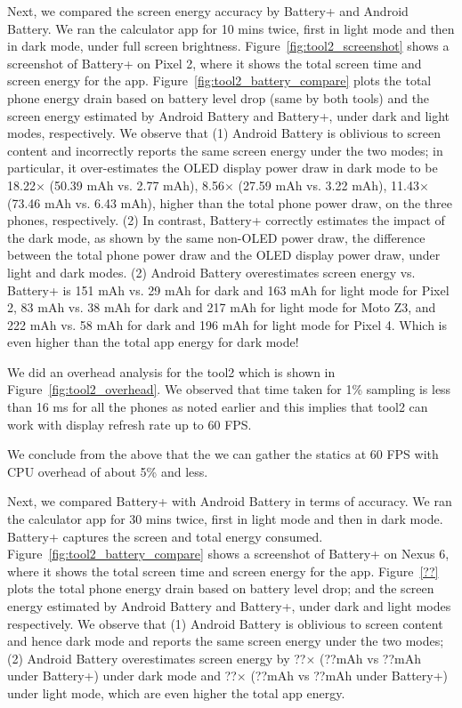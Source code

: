 Next, we compared the screen energy accuracy by 
Battery+ and Android Battery.
We ran the calculator app for 10 mins twice, first in light mode and then in
dark mode, under full screen brightness.
Figure~\ref{fig:tool2_screenshot} shows a screenshot of
Battery+ on Pixel 2, where it shows the total screen time and screen energy
for the app.
Figure~\ref{fig:tool2_battery_compare} plots the
total phone energy drain based on battery level drop (same by  both tools)
and the screen energy estimated by Android Battery and Battery+,
under dark and light modes, respectively.
We observe that
(1) Android Battery is oblivious to screen content and incorrectly reports
the same screen energy under the two modes;
in particular, it over-estimates the  OLED display power draw in dark mode
to be 18.22$\times$ (50.39 mAh vs. 2.77 mAh), 
8.56$\times$ (27.59 mAh vs. 3.22 mAh), 
11.43$\times$ (73.46 mAh vs. 6.43 mAh),
higher than the total phone power draw, on the three phones, respectively.
(2) In contrast, Battery+ correctly estimates the impact of the dark mode,
as shown by the same non-OLED power draw, \ie the difference 
between the total phone power draw and the OLED display power draw,
under light and dark modes.
(2) Android Battery overestimates screen energy vs. Battery+ is
151 mAh vs. 29 mAh for dark and 163 mAh for light mode for Pixel 2,
83 mAh vs. 38 mAh for dark and 217 mAh for light mode for Moto Z3, and
222 mAh vs. 58 mAh for dark and 196 mAh for light mode for Pixel 4.
Which is even higher than the total app energy for dark mode!
\fi

We did an overhead analysis for the tool2 which is shown in Figure~\ref{fig:tool2_overhead}.
We observed that time taken for 1\% sampling is less than 16 ms for all the phones
as noted earlier and this  implies that tool2 can work with display refresh rate up to 60 FPS.

We conclude from the above that the we can gather the statics at
60 FPS with CPU overhead of about 5\% and less.

Next, we compared Battery+ with Android Battery in terms of accuracy.
We ran the calculator app for 30 mins twice, first in light mode and then in
dark mode. Battery+ captures the screen and total energy
consumed. 
Figure~\ref{fig:tool2_battery_compare} shows a screenshot of
Battery+ on Nexus 6, where it shows the total screen time and screen energy
for the app.
Figure~\ref{??} plots the
total phone energy drain based on battery level drop;
and the screen energy estimated by Android Battery and Battery+,
under dark and light modes respectively.
We observe that
(1) Android Battery is oblivious to screen content and hence
dark mode and reports the same screen energy under the two modes;
(2) Android Battery overestimates screen energy
by ??$\times$ (??mAh vs ??mAh under Battery+) under dark mode
and ??$\times$ (??mAh vs ??mAh under Battery+) under light mode,
which are even higher the total app energy.
\fi

